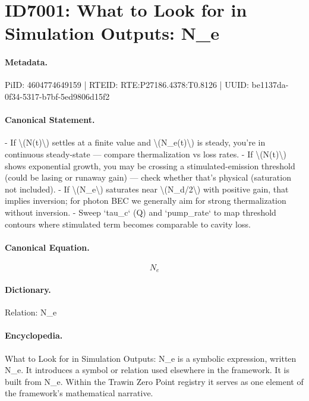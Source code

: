 \section*{ID7001: What to Look for in Simulation Outputs: N\_e}
\paragraph{Metadata.}
PiID: 4604774649159 | RTEID: RTE:P27186.4378:T0.8126 | UUID: be1137da-0f34-5317-b7bf-5ed9806d15f2

\paragraph{Canonical Statement.}
- If \textbackslash{}(N(t)\textbackslash{}) settles at a finite value and \textbackslash{}(N\_e(t)\textbackslash{}) is steady, you’re in continuous steady-state — compare thermalization vs loss rates. - If \textbackslash{}(N(t)\textbackslash{}) shows exponential growth, you may be crossing a stimulated-emission threshold (could be lasing or runaway gain) — check whether that’s physical (saturation not included). - If \textbackslash{}(N\_e\textbackslash{}) saturates near \textbackslash{}(N\_d/2\textbackslash{}) with positive gain, that implies inversion; for photon BEC we generally aim for strong thermalization without inversion. - Sweep `tau\_c` (Q) and `pump\_rate` to map threshold contours where stimulated term becomes comparable to cavity loss.

\paragraph{Canonical Equation.}
\[
N_e
\]

\paragraph{Dictionary.}
Relation: N\_e

\paragraph{Encyclopedia.}
What to Look for in Simulation Outputs: N\_e is a symbolic expression, written N\_e. It introduces a symbol or relation used elsewhere in the framework. It is built from N\_e. Within the Trawin Zero Point registry it serves as one element of the framework's mathematical narrative.
